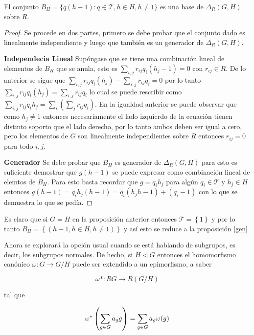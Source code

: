 \begin{proposicion}
El conjunto $B_H = \{q(h-1) : q \in \mathcal{T}, h \in H, h \neq 1  \}$ es una base de $\Delta_R(G,H)$ sobre $R$.
\end{proposicion} 

\begin{proof}
Se procede en dos partes, primero se debe probar que el conjunto dado es linealmente independiente y luego que también es un generador de $\Delta_R(G,H)$. 

\textbf{Independecia Lineal} Supóngase que se tiene una combinación lineal de elementos de $B_H$ que se anula, esto es $\sum_{i,j}r_{ij}q_i(h_j-1) =0 $ con $r_{ij} \in R$. De lo anterior se sigue que $\sum_{i,j}r_{ij}q_i(h_j)-\sum_{i,j}r_{ij}q_i = 0$ por lo tanto $ \sum_{i,j}r_{ij}q_i(h_j) = \sum_{i,j}r_{ij}q_i $ lo cual se puede rescribir como $\sum_{i,j}r_{ij}q_ih_j =  \sum_i\left( \sum_jr_{ij}q_i \right)$. En la igualdad anterior se puede observar que como $h_j \neq 1$ entonces necesariamente el lado izquierdo de la ecuación tienen distinto soporto que el lado derecho, por lo tanto ambos deben ser igual a cero, pero los elementos de $G$ son linealmente independientes sobre $R$ entonces $r_{ij} = 0$  para todo $i,j$.

\textbf{Generador}
Se debe probar que $B_H$ es generador de $\Delta_R(G,H)$ para esto es suficiente demostrar que $g(h-1)$  se puede expresar  como combinación lineal de elemtos de $B_H$. Para esto basta recordar que $g = q_ih_j$ para algún $q_i \in \mathcal{T}$ y $h_j \in H$ entonces $g(h-1) = q_ih_j(h-1) = q_i(h_jh-1)+ (q_i-1) $ con lo que se demuestra lo que se pedía. \qedhere
\end{proof}


\begin{nota}
Es claro que si $G=H$ en la proposición anterior entonces $\mathcal{T} = \left\{ 1 \right\}$ y por lo tanto $B_H = \left\{ (h-1 , h \in H, h \neq 1) \right\}$ y así esto se reduce a la proposición \ref{gen} 

\end{nota}

Ahora se explorará la opción usual cuando se está hablando de subgrupos, es decir, los subgrupos normales. De hecho, si $H \lhd G$ entonces el homomorfismo canónico $\omega : G \to G/H$ puede ser extendido a un epimorfismo, a saber 

\[\omega* : RG \to R(G/H)\]

tal que 

\[\omega^*\left(\sum_{g \in G} a_{g} g \right) = \sum_{g \in G} a_g\omega(g)\]

